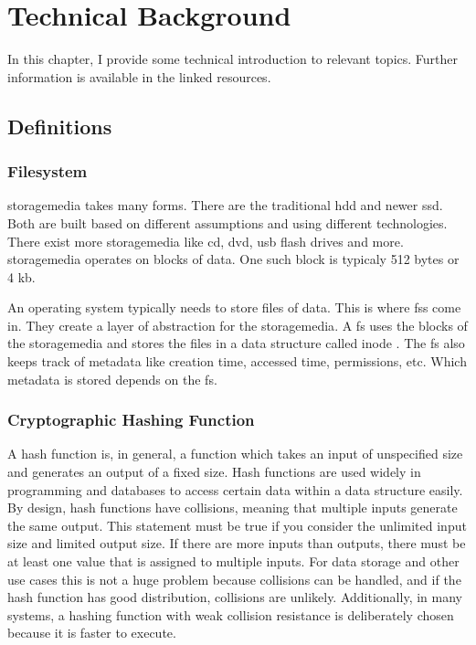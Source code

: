 \chapter{Technical Background}

In this chapter, I provide some technical introduction to relevant topics. Further information is available in the linked resources.

\section{Definitions}

\subsection{Filesystem}
\label{sec:fs}

\gls{storagemedia} takes many forms. There are the traditional \gls{hdd} and newer \gls{ssd}. Both are built based on different assumptions and using different technologies. There exist more \gls{storagemedia} like \gls{cd}, \gls{dvd}, \gls{usb} flash drives and more. \gls{storagemedia} operates on blocks of data. One such block is typicaly 512 bytes or 4 \gls{kb}. \cite{bruce:imaging}

An operating system typically needs to store files of data. This is where \glspl{fs} come in. They create a layer of abstraction for the \gls{storagemedia}. A \gls{fs} uses the blocks of the \gls{storagemedia} and stores the files in a data structure called inode \cite{inode}. The \gls{fs} also keeps track of \gls{metadata} like creation time, accessed time, permissions, etc. Which \gls{metadata} is stored depends on the \gls{fs}. \cite{bruce:imaging}

\subsection{Cryptographic Hashing Function}
\label{sec:hashing}

A hash function is, in general, a function which takes an input of unspecified size and generates an output of a fixed size. Hash functions are used widely in programming and databases to access certain data within a data structure easily. By design, hash functions have \glspl{collision}, meaning that multiple inputs generate the same output. This statement must be true if you consider the unlimited input size and limited output size. If there are more inputs than outputs, there must be at least one value that is assigned to multiple inputs. For data storage and other use cases this is not a huge problem because collisions can be handled, and if the hash function has good distribution, collisions are unlikely. Additionally, in many systems, a hashing function with weak collision resistance is deliberately chosen because it is faster to execute. \cite{hash:noncrypto, hash:slow}

